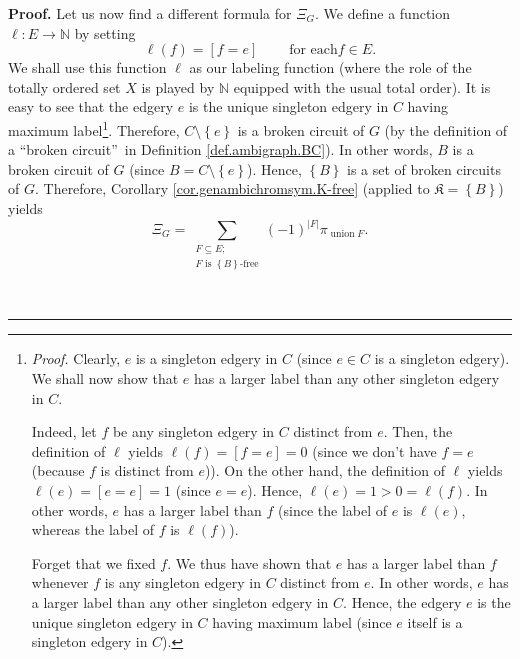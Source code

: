 \documentclass[numbers=enddot,12pt,final,onecolumn,notitlepage]{scrartcl}%
\theoremstyle{definition}
\newenvironment{proof}[1][Proof]{\noindent\textbf{#1.} }{\ \rule{0.5em}{0.5em}}
\newenvironment{verlong}{}{}
\let\sumnonlimits\sum
\renewcommand{\sum}{\sumnonlimits\limits}
\begin{document}
\begin{proof}
\begin{verlong}
Let us now find a different formula for $\Xi_{G}$. We define a function
$\ell:E\rightarrow\mathbb{N}$ by setting%
\[
\ell\left(  f\right)  =\left[  f=e\right]  \ \ \ \ \ \ \ \ \ \ \text{for each
}f\in E.
\]
We shall use this function $\ell$ as our labeling function (where the role of
the totally ordered set $X$ is played by $\mathbb{N}$ equipped with the usual
total order). It is easy to see that the edgery $e$ is the unique singleton
edgery in $C$ having maximum label\footnote{\textit{Proof.} Clearly, $e$ is a
singleton edgery in $C$ (since $e\in C$ is a singleton edgery). We shall now
show that $e$ has a larger label than any other singleton edgery in $C$.
\par
Indeed, let $f$ be any singleton edgery in $C$ distinct from $e$. Then, the
definition of $\ell$ yields $\ell\left(  f\right)  =\left[  f=e\right]  =0$
(since we don't have $f=e$ (because $f$ is distinct from $e$)). On the other
hand, the definition of $\ell$ yields $\ell\left(  e\right)  =\left[
e=e\right]  =1$ (since $e=e$). Hence, $\ell\left(  e\right)  =1>0=\ell\left(
f\right)  $. In other words, $e$ has a larger label than $f$ (since the label
of $e$ is $\ell\left(  e\right)  $, whereas the label of $f$ is $\ell\left(
f\right)  $).
\par
Forget that we fixed $f$. We thus have shown that $e$ has a larger label than
$f$ whenever $f$ is any singleton edgery in $C$ distinct from $e$. In other
words, $e$ has a larger label than any other singleton edgery in $C$. Hence,
the edgery $e$ is the unique singleton edgery in $C$ having maximum label
(since $e$ itself is a singleton edgery in $C$).}. Therefore, $C\setminus
\left\{  e\right\}  $ is a broken circuit of $G$ (by the definition of a
\textquotedblleft broken circuit\textquotedblright\ in Definition
\ref{def.ambigraph.BC}). In other words, $B$ is a broken circuit of $G$ (since
$B=C\setminus\left\{  e\right\}  $). Hence, $\left\{  B\right\}  $ is a set of
broken circuits of $G$. Therefore, Corollary \ref{cor.genambichromsym.K-free}
(applied to $\mathfrak{K}=\left\{  B\right\}  $) yields
\begin{equation}
\Xi_{G}=\sum_{\substack{F\subseteq E;\\F\text{ is }\left\{  B\right\}
\text{-free}}}\left(  -1\right)  ^{\left\vert F\right\vert }\pi
_{\operatorname*{union}F}. \label{pf.thm.dahwil.gen.XiG.c2.pf.3}%
\end{equation}



\end{verlong}
\end{proof}
\end{document}
